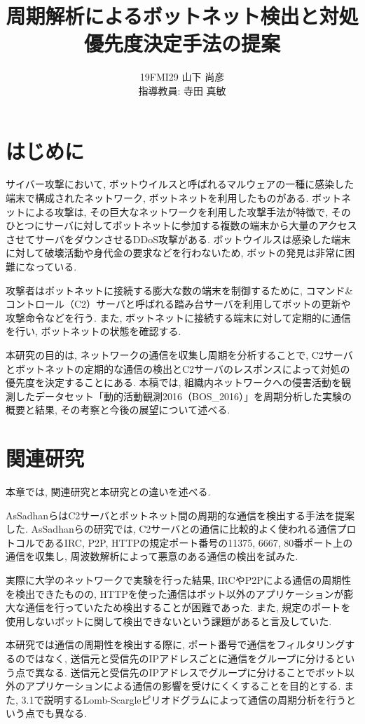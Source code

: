 \documentclass[twocolumn,9pt]{ltjsarticle}
\title{周期解析によるボットネット検出と対処優先度決定手法の提案}
\author{19FMI29 山下 尚彦 \\ 指導教員: 寺田 真敏}
\date{}
\begin{document}
\maketitle

\section{はじめに}
サイバー攻撃において, ボットウイルスと呼ばれるマルウェアの一種に感染した端末で構成されたネットワーク, ボットネットを利用したものがある. ボットネットによる攻撃は, その巨大なネットワークを利用した攻撃手法が特徴で, そのひとつにサーバに対してボットネットに参加する複数の端末から大量のアクセスさせてサーバをダウンさせるDDoS攻撃がある. ボットウイルスは感染した端末に対して破壊活動や身代金の要求などを行わないため, ボットの発見は非常に困難になっている. 

攻撃者はボットネットに接続する膨大な数の端末を制御するために, コマンド\&コントロール（C2）サーバと呼ばれる踏み台サーバを利用してボットの更新や攻撃命令などを行う. また, ボットネットに接続する端末に対して定期的に通信を行い, ボットネットの状態を確認する. 

本研究の目的は, ネットワークの通信を収集し周期を分析することで, C2サーバとボットネットの定期的な通信の検出とC2サーバのレスポンスによって対処の優先度を決定することにある. 本稿では, 組織内ネットワークへの侵害活動を観測したデータセット「動的活動観測2016（BOS\_2016）」\cite{マルウェア対策研42:online}を周期分析した実験の概要と結果, その考察と今後の展望について述べる. 

\section{関連研究}
本章では, 関連研究と本研究との違いを述べる. 

AsSadhanらはC2サーバとボットネット間の周期的な通信を検出する手法を提案した\cite{assadhan2018analysis}. AsSadhanらの研究では, C2サーバとの通信に比較的よく使われる通信プロトコルであるIRC, P2P, HTTPの規定ポート番号の11375, 6667, 80番ポート上の通信を収集し, 周波数解析によって悪意のある通信の検出を試みた. 

実際に大学のネットワークで実験を行った結果, IRCやP2Pによる通信の周期性を検出できたものの, HTTPを使った通信はボット以外のアプリケーションが膨大な通信を行っていたため検出することが困難であった. また, 規定のポートを使用しないボットに関して検出できないという課題があると言及していた. 

本研究では通信の周期性を検出する際に, ポート番号で通信をフィルタリングするのではなく, 送信元と受信先のIPアドレスごとに通信をグループに分けるという点で異なる. 送信元と受信先のIPアドレスでグループに分けることでボット以外のアプリケーションによる通信の影響を受けにくくすることを目的とする. また, 3.1で説明するLomb-Scargleピリオドグラムによって通信の周期分析を行うという点でも異なる. 
\end{document}
